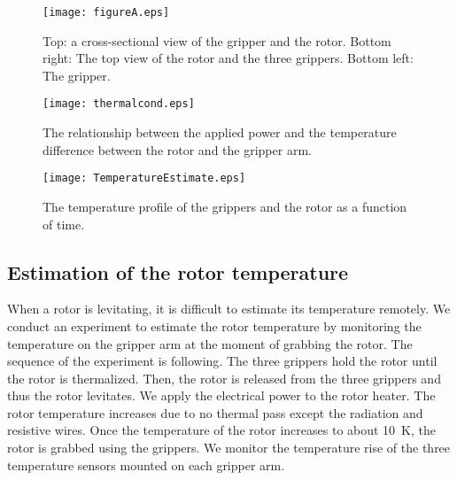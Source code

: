 \documentclass[journal]{IEEEtran}
\begin{document}

\begin{figure}[htb]
   \centering
   \texttt{[image: figureA.eps]} %
   \caption{Top: a cross-sectional view of the gripper and the rotor. Bottom right: The top view of the rotor and the three grippers. Bottom left: The gripper.}
   \label{fig:figureA}
\end{figure}

\begin{figure}[htb]
   \centering
   \texttt{[image: thermalcond.eps]} %
   \caption{The relationship between the applied power and the temperature difference between the rotor and the gripper arm. }
   \label{fig:thermalcond}
\end{figure}

\begin{figure}[htb]
   \centering
   \texttt{[image: TemperatureEstimate.eps]} %
   \caption{The temperature profile of the grippers and the rotor as a function of time. }
   \label{fig:TemperatureEstimate}
\end{figure}

\subsection{Estimation of the rotor temperature}
When a rotor is levitating, it is difficult to estimate its temperature remotely.
We conduct an experiment to estimate the rotor temperature by monitoring the temperature on the gripper arm at the moment of grabbing the rotor.
The sequence of the experiment is following.
The three grippers hold the rotor until the rotor is thermalized.
Then, the rotor is released from the three grippers and thus the rotor levitates.
We apply the electrical power to the rotor heater.
The rotor temperature increases due to no thermal pass except the radiation and resistive wires.
Once the temperature of the rotor increases to about 10~K, the rotor is grabbed using the grippers.
We monitor the temperature rise of the three temperature sensors mounted on each gripper arm.
\end{document}
